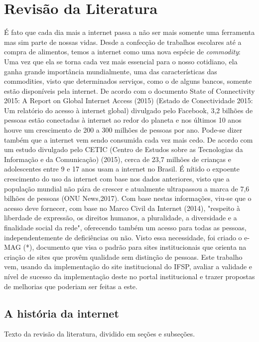 \chapter{Revisão da Literatura}
\label{cap:02}

É fato que cada dia mais a internet passa a não ser mais somente uma ferramenta mas sim parte de nossas vidas. Desde a confecção de trabalhos escolares até a compra de alimentos, temos a internet como uma nova espécie de \textit{commodity}: Uma vez que ela se torna cada vez mais essencial para o nosso cotidiano, ela ganha grande importância mundialmente, uma das características das commodities, visto que determinados serviços, como o de alguns bancos, somente estão disponíveis pela internet. De acordo com o documento State of Connectivity 2015: A Report on Global Internet Access (2015) (Estado de Conectividade 2015: Um relatório do acesso à internet global) divulgado pelo Facebook, 3,2 bilhões de pessoas estão conectadas à internet ao redor do planeta e nos últimos 10 anos houve um crescimento de 200 a 300 milhões de pessoas por ano. Pode-se dizer também que a internet vem sendo consumida cada vez mais cedo. De acordo com um estudo divulgado pelo CETIC (Centro de Estudos sobre as Tecnologias da Informação e da Comunicação) (2015), cerca de 23,7 milhões de crianças e adolescentes entre 9 e 17 anos usam a internet no Brasil. É nítido o expoente crescimento do uso da internet com base nos dados anteriores, visto que a população mundial não pára de crescer e atualmente ultrapassou a marca de 7,6 bilhões de pessoas (ONU News,2017). Com base nestas informações, viu-se que o acesso deve fornecer, com base no Marco Civil da Internet (2014), "respeito à liberdade de expressão, os direitos humanos, a pluralidade, a diversidade e a finalidade social da rede", oferecendo também um acesso para todas as pessoas, independentemente de deficiências ou não. Visto essa necessidade, foi criado o e-MAG (*), documento que visa o padrão para sites institucionais que orienta na criação de sites que provêm qualidade sem distinção de pessoas. Este trabalho vem, usando da implementação do site institucional do IFSP, avaliar a validade e nível de sucesso da implementação deste no portal institucional e trazer propostas de melhorias que poderiam ser feitas a este.

\section{A história da internet}


Texto da revisão da literatura, dividido em seções e subseções.



